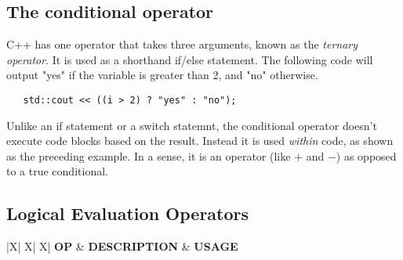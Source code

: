 \documentclass{article}
\begin{document}
\subsection{The conditional operator}
C++ has one operator that takes three arguments, known as the \textit{ternary operator}. It is used
as a shorthand if/else statement. The following code will output "yes" if the variable is greater than
2, and "no" otherwise.
\begin{verbatim}
   std::cout << ((i > 2) ? "yes" : "no");
\end{verbatim}
Unlike an if statement or a switch statemnt, the conditional operator doesn't execute code blocks based
on the result. Instead it is used \textit{within} code, as shown as the preceding example. In a sense,
it is an operator (like $+$ and $-$) as opposed to a true conditional.
\subsection{Logical Evaluation Operators}
\begin{center}
	\begin{tabularx}{|\raggedleft X| X| X|}
		\textbf{OP} & \textbf{DESCRIPTION} & \textbf{USAGE} \\
	\end{tabularx}
\end{center}
\end{document}
